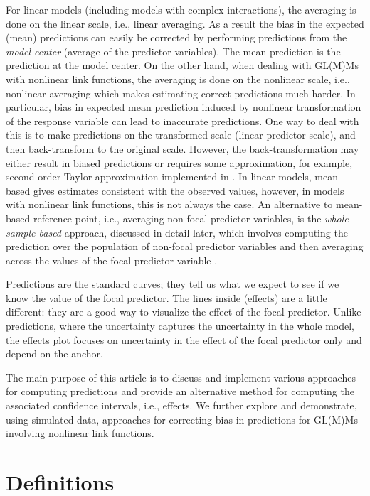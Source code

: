 For linear models (including models with complex interactions), the averaging is done on the linear scale, i.e., linear averaging. As a result the bias in the expected (mean) predictions can easily be corrected by performing predictions from the \emph{model center} (average of the predictor variables). The mean prediction is the prediction at the model center. On the other hand, when dealing with GL(M)Ms with nonlinear link functions, the averaging is done on the nonlinear scale, i.e., nonlinear averaging which makes estimating correct predictions much harder. In particular, bias in expected mean prediction induced by nonlinear transformation of the response variable can lead to inaccurate predictions. One way to deal with this is to make predictions on the transformed scale (linear predictor scale), and then back-transform to the original scale. However, the back-transformation may either result in biased predictions or requires some approximation, for example, second-order Taylor approximation implemented in  \citep{lenth2018package}. In linear models, mean-based gives estimates consistent with the observed values, however, in models with nonlinear link functions, this is not always the case. An alternative to mean-based reference point, i.e., averaging non-focal predictor variables, is the \emph{whole-sample-based} approach, discussed in detail later, which involves computing the prediction over the population of non-focal predictor variables and then averaging across the values of the focal predictor variable \citep{hanmer2013behind}. 

Predictions are the standard curves; they tell us what we expect to see if we know the value of the focal predictor. The lines inside (effects) are a little different: they are a good way to visualize the effect of the focal predictor. Unlike predictions, where the uncertainty captures the uncertainty in the whole model, the effects plot focuses on uncertainty in the effect of the focal predictor only and depend on the anchor.

The main purpose of this article is to discuss and implement various approaches for computing predictions and provide an alternative method for computing the associated confidence intervals, i.e., effects. We further explore and demonstrate, using simulated data, approaches for correcting bias in predictions for GL(M)Ms involving nonlinear link functions.

\section{Definitions}

